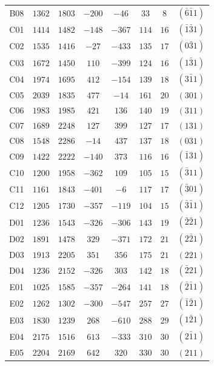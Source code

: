 \begin{table}[H]
\begin{tabular}{c|c|c|c|c|c|c|c}
        B08 & $1362$ & $1803$ & $-200$ & $ -46$ & $ 33$ & $ 8$ & $(\bar{6}\bar{1}1)$ \\
        C01 & $1414$ & $1482$ & $-148$ & $-367$ & $114$ & $16$ & $(\bar{1}\bar{3}1)$ \\
        C02 & $1535$ & $1416$ & $ -27$ & $-433$ & $135$ & $17$ & $(0\bar{3}1)$ \\
        C03 & $1672$ & $1450$ & $ 110$ & $-399$ & $124$ & $16$ & $(1\bar{3}1)$ \\
        C04 & $1974$ & $1695$ & $ 412$ & $-154$ & $139$ & $18$ & $(3\bar{1}1)$ \\
        C05 & $2039$ & $1835$ & $ 477$ & $ -14$ & $161$ & $20$ & $(301)$ \\
        C06 & $1983$ & $1985$ & $ 421$ & $ 136$ & $140$ & $19$ & $(311)$ \\
        C07 & $1689$ & $2248$ & $ 127$ & $ 399$ & $127$ & $17$ & $(131)$ \\
        C08 & $1548$ & $2286$ & $ -14$ & $ 437$ & $137$ & $18$ & $(031)$ \\
        C09 & $1422$ & $2222$ & $-140$ & $ 373$ & $116$ & $16$ & $(\bar{1}31)$ \\
        C10 & $1200$ & $1958$ & $-362$ & $ 109$ & $105$ & $15$ & $(\bar{3}11)$ \\
        C11 & $1161$ & $1843$ & $-401$ & $  -6$ & $117$ & $17$ & $(\bar{3}01)$ \\
        C12 & $1205$ & $1730$ & $-357$ & $-119$ & $104$ & $15$ & $(\bar{3}\bar{1}1)$ \\
        D01 & $1236$ & $1543$ & $-326$ & $-306$ & $143$ & $19$ & $(\bar{2}\bar{2}1)$ \\
        D02 & $1891$ & $1478$ & $ 329$ & $-371$ & $172$ & $21$ & $(2\bar{2}1)$ \\
        D03 & $1913$ & $2205$ & $ 351$ & $ 356$ & $175$ & $21$ & $(221)$ \\
        D04 & $1236$ & $2152$ & $-326$ & $ 303$ & $142$ & $18$ & $(\bar{2}21)$ \\
        E01 & $1025$ & $1585$ & $-357$ & $-264$ & $141$ & $18$ & $(\bar{2}\bar{1}1)$ \\
        E02 & $1262$ & $1302$ & $-300$ & $-547$ & $257$ & $27$ & $(\bar{1}\bar{2}1)$ \\
        E03 & $1830$ & $1239$ & $ 268$ & $-610$ & $288$ & $29$ & $(1\bar{2}1)$ \\
        E04 & $2175$ & $1516$ & $ 613$ & $-333$ & $310$ & $30$ & $(2\bar{1}1)$ \\
        E05 & $2204$ & $2169$ & $ 642$ & $ 320$ & $330$ & $30$ & $(211)$ \\

\end{tabular}
\end{table}
